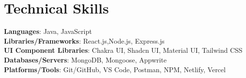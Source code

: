 \documentclass[letterpaper,11pt]{article}
\begin{document}
\section{Technical Skills}
\vspace{5pt}
\begin{itemize}[leftmargin=0.15in, label={}]
\small{\item{
      \textbf{Languages}{: Java, JavaScript } \\
      \vspace{3pt}\textbf{Libraries/Frameworks}{: React.js,Node.js, Express.js} \\
      \vspace{3pt}\textbf{UI Component Libraries}{: Chakra UI, Shadcn UI, Material UI, Tailwind CSS} \\
      \vspace{3pt}\textbf{Databases/Servers}{: MongoDB, Mongoose, Appwrite} \\
      \vspace{3pt}\textbf{Platforms/Tools}{: Git/GitHub, VS Code, Postman, NPM, Netlify, Vercel }
      }}
\end{itemize}


\end{document}
